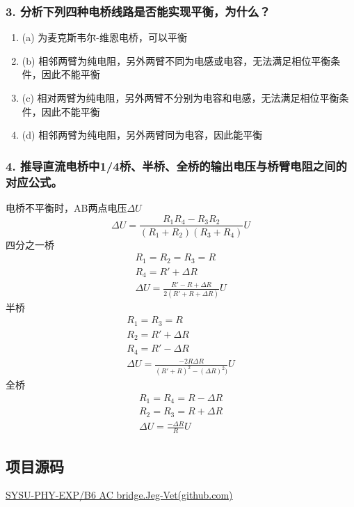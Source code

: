 \documentclass[12pt,a4paper,UTF8]{ctexart}
\begin{document}
\subsubsection*{3. 分析下列四种电桥线路是否能实现平衡，为什么？}
\begin{enumerate}[label=\arabic*.]
    \item (a) 为麦克斯韦尔-维恩电桥，可以平衡
    \item (b) 相邻两臂为纯电阻，另外两臂不同为电感或电容，无法满足相位平衡条件，因此不能平衡
    \item (c) 相对两臂为纯电阻，另外两臂不分别为电容和电感，无法满足相位平衡条件，因此不能平衡
    \item (d) 相邻两臂为纯电阻，另外两臂同为电容，因此能平衡
\end{enumerate}
\subsubsection*{4. 推导直流电桥中1/4桥、半桥、全桥的输出电压与桥臂电阻之间的对应公式。}
电桥不平衡时，AB两点电压$\Delta U$
\begin{equation}
    \Delta U = \frac{R_1R_4-R_3R_2}{(R_1+R_2)(R_3+R_4)}U
\end{equation}
四分之一桥
\begin{gather}
    R_1=R_2=R_3=R   \\
    R_4 = R' + \Delta R \\
    \Delta U = \frac{R'- R + \Delta R}{2(R'+ R + \Delta R)}U
\end{gather}
半桥
\begin{gather}
    R_1=R_3=R   \\
    R_2 = R' + \Delta R \\
    R_4 = R' - \Delta R \\
    \Delta U = \frac{-2R\Delta R}{(R'+ R)^2 - (\Delta R)^2)}U
\end{gather}
全桥
\begin{gather}
    R_1=R_4=R - \Delta R    \\
    R_2=R_3=R + \Delta R    \\
    \Delta U = \frac{-\Delta R}{R}U
\end{gather}

\subsection*{项目源码}
\href{https://github.com/Jeg-Vet/SYSU-PHY-EXP/tree/main/B6-AC_bridge}{SYSU-PHY-EXP/B6 AC bridge.Jeg-Vet(github.com)}
\end{document}

